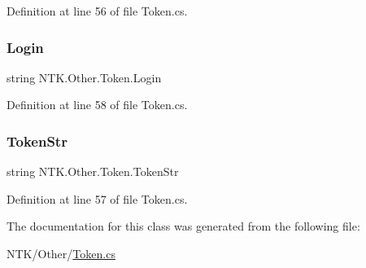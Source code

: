 Definition at line 56 of file Token.\+cs.

\mbox{\label{class_n_t_k_1_1_other_1_1_token_a29d851ed4017a3ecabf70febe3eda6c7}} 
\subsubsection{\texorpdfstring{Login}{Login}}
{\footnotesize\ttfamily string N\+T\+K.\+Other.\+Token.\+Login\hspace{0.3cm}{\ttfamily [get]}}



Definition at line 58 of file Token.\+cs.

\mbox{\label{class_n_t_k_1_1_other_1_1_token_a8d218f446c6f8198dbe07bdf897cd6bf}} 
\subsubsection{\texorpdfstring{TokenStr}{TokenStr}}
{\footnotesize\ttfamily string N\+T\+K.\+Other.\+Token.\+Token\+Str\hspace{0.3cm}{\ttfamily [get]}}



Definition at line 57 of file Token.\+cs.



The documentation for this class was generated from the following file\+:\begin{DoxyCompactItemize}
\item 
N\+T\+K/\+Other/\mbox{\hyperlink{_token_8cs}{Token.\+cs}}\end{DoxyCompactItemize}
